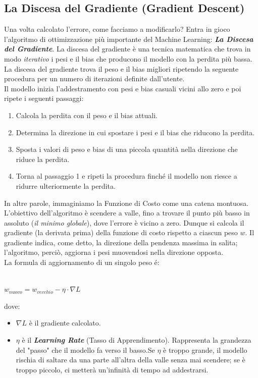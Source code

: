 \documentclass{article}
\begin{document}
\subsection{La Discesa del Gradiente {(Gradient Descent)}}
Una volta calcolato l'errore, come facciamo a modificarlo? Entra in gioco l'algoritmo di ottimizzazione più importante del Machine Learning: \textbf{\textit{La Discesa del Gradiente}}.
La discesa del gradiente è una tecnica matematica che trova in modo \textit{iterativo} i pesi e il bias che producono il modello con la perdita più bassa. La discesa del gradiente trova il peso e il bias migliori ripetendo la seguente procedura per un numero di iterazioni definite dall'utente.\\
Il modello inizia l'addestramento con pesi e bias casuali vicini allo zero e poi ripete i seguenti passaggi: \\
\begin{enumerate}
    \item Calcola la perdita con il peso e il bias attuali.

    \item Determina la direzione in cui spostare i pesi e il bias che riducono la perdita.

    \item Sposta i valori di peso e bias di una piccola quantità nella direzione che riduce la perdita.

    \item Torna al passaggio 1 e ripeti la procedura finché il modello non riesce a ridurre ulteriormente la perdita.
\end{enumerate}
In altre parole, immaginiamo la Funzione di Costo come una catena montuosa. L'obiettivo dell'algoritmo è scendere a valle, fino a trovare il punto più basso in assoluto (\textit{il minimo globale}), dove l'errore è vicino a zero. Dunque si calcola il gradiente (la derivata prima) della funzione di costo rispetto a ciascun peso $w$. Il gradiente indica, come detto, la direzione della pendenza massima in salita; l'algoritmo, perciò, aggiorna i pesi muovendosi nella direzione opposta. \\
La formula di aggiornamento di un singolo peso é: \\
\\
\centerline{$w_{nuovo} = w_{vecchio} - \eta \cdot \nabla L$}
dove:
\begin{itemize}
    \item $\nabla L$ è il gradiente calcolato.

    \item $\eta$ è il \textbf{\textit{Learning Rate}} (Tasso di Apprendimento). Rappresenta la grandezza del "passo" che il modello fa verso il basso.Se $\eta$ è troppo grande, il modello rischia di saltare da una parte all'altra della valle senza mai scendere; se è troppo piccolo, ci metterà un'infinità di tempo ad addestrarsi.
\end{itemize}
\end{document}
